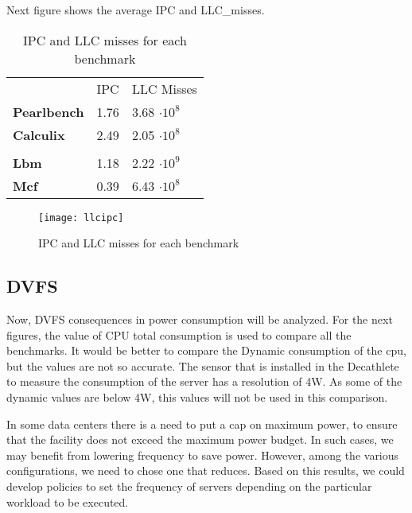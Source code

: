 Next figure shows the average IPC and LLC\_misses.

\begin{table}[H]
\begin{center}
\begin{tabular}{p{4cm} p{3cm} p{3cm}}
  \bf &  IPC & LLC Misses \\
  \bf Pearlbench & 1.76 & 3.68 $\cdot {10}^{8}$ \\
  \bf Calculix & 2.49 & 2.05 $\cdot {10}^{8}$\\
  \\
  \bf Lbm & 1.18 & 2.22 $\cdot {10}^{9}$\\
  \bf Mcf & 0.39 & 6.43 $\cdot {10}^{8}$\\
\end{tabular}
\end{center}
\caption{IPC and LLC misses for each benchmark}
\label{tab:ipcllc}
\end{table}

\begin{figure}[H]
\begin{center}
\texttt{[image: llcipc]} %
\caption{IPC and LLC misses for each benchmark}
\label{fig:llcipc} %
\end{center}
\end{figure}


\subsection{DVFS}

Now, DVFS consequences in power consumption will be analyzed. For the next figures, the value of CPU total consumption is used to compare all the benchmarks. It would be better to compare the Dynamic consumption of the cpu, but the values are not so accurate. The sensor that is installed in the Decathlete to measure the consumption of the server has a resolution of 4W. As some of the dynamic values are below 4W, this values will not be used in this comparison.

In some data centers there is a need to put a cap on maximum power, to ensure that the facility does not exceed the maximum power budget. In such cases, we may benefit from lowering frequency to save power. However, among the various configurations, we need to chose one that reduces. Based on this results, we could develop policies to set the frequency of servers depending on the particular workload to be executed.

